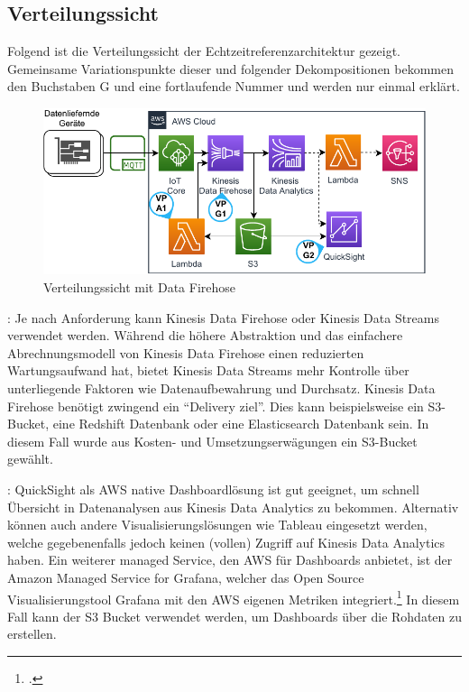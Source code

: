 \subsection{Verteilungssicht}
Folgend ist die Verteilungssicht der Echtzeitreferenzarchitektur gezeigt. Gemeinsame Variationspunkte dieser und folgender Dekompositionen bekommen den Buchstaben G und eine fortlaufende Nummer und werden nur einmal erklärt.
\begin{figure}[H]
\centering
\includegraphics[width=\textwidth]{graphics/Echtzeit-RA-Overview-Firehose}
\caption{Verteilungssicht mit Data Firehose}
\label{abb:TopLevelEchtzeitRA}
\end{figure}

: Je nach Anforderung kann Kinesis Data Firehose oder Kinesis Data Streams verwendet werden. Während die höhere Abstraktion und das einfachere Abrechnungsmodell von Kinesis Data Firehose einen reduzierten Wartungsaufwand hat, bietet Kinesis Data Streams mehr Kontrolle über unterliegende Faktoren wie Datenaufbewahrung und Durchsatz. Kinesis Data Firehose benötigt zwingend ein \enquote{Delivery ziel}. Dies kann beispielsweise ein \ac{S3}-Bucket, eine Redshift Datenbank oder eine Elasticsearch Datenbank sein. In diesem Fall wurde aus Kosten- und Umsetzungserwägungen ein \ac{S3}-Bucket gewählt.



: QuickSight als \ac{AWS} native Dashboardlösung ist gut geeignet, um schnell Übersicht in Datenanalysen aus Kinesis Data Analytics zu bekommen. Alternativ können auch andere Visualisierungslösungen wie Tableau eingesetzt werden, welche gegebenenfalls jedoch keinen (vollen) Zugriff auf Kinesis Data Analytics haben. Ein weiterer managed Service, den \ac{AWS} für Dashboards anbietet, ist der Amazon Managed Service for Grafana, welcher das Open Source Visualisierungstool Grafana mit den \ac{AWS} eigenen Metriken integriert.\footcite[Vgl.][]{Dutt.2020} In diesem Fall kann der \ac{S3} Bucket verwendet werden, um Dashboards über die Rohdaten zu erstellen. 


